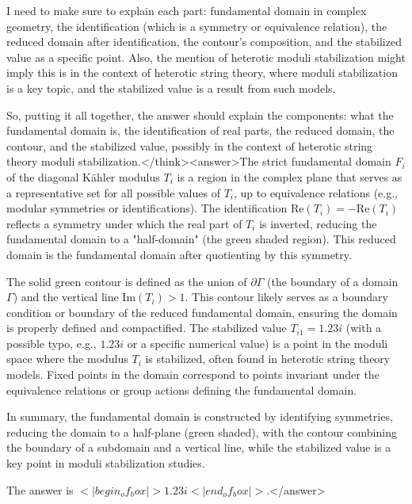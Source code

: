I need to make sure to explain each part: fundamental domain in complex geometry, the identification (which is a symmetry or equivalence relation), the reduced domain after identification, the contour's composition, and the stabilized value as a specific point. Also, the mention of heterotic moduli stabilization might imply this is in the context of heterotic string theory, where moduli stabilization is a key topic, and the stabilized value is a result from such models.

So, putting it all together, the answer should explain the components: what the fundamental domain is, the identification of real parts, the reduced domain, the contour, and the stabilized value, possibly in the context of heterotic string theory moduli stabilization.</think><answer>The strict fundamental domain \( F_i \) of the diagonal Kähler modulus \( T_i \) is a region in the complex plane that serves as a representative set for all possible values of \( T_i \), up to equivalence relations (e.g., modular symmetries or identifications). The identification \( \text{Re}(T_i) = -\text{Re}(T_i) \) reflects a symmetry under which the real part of \( T_i \) is inverted, reducing the fundamental domain to a "half-domain" (the green shaded region). This reduced domain is the fundamental domain after quotienting by this symmetry.  

The solid green contour is defined as the union of \( \partial\Gamma \) (the boundary of a domain \( \Gamma \)) and the vertical line \( \text{Im}(T_i) > 1 \). This contour likely serves as a boundary condition or boundary of the reduced fundamental domain, ensuring the domain is properly defined and compactified. The stabilized value \( T_{i1} = 1.23i \) (with a possible typo, e.g., \( 1.23i \) or a specific numerical value) is a point in the moduli space where the modulus \( T_i \) is stabilized, often found in heterotic string theory models. Fixed points in the domain correspond to points invariant under the equivalence relations or group actions defining the fundamental domain.  

In summary, the fundamental domain is constructed by identifying symmetries, reducing the domain to a half-plane (green shaded), with the contour combining the boundary of a subdomain and a vertical line, while the stabilized value is a key point in moduli stabilization studies.  

The answer is \(<|begin_of_box|>1.23i<|end_of_box|>\).</answer>
